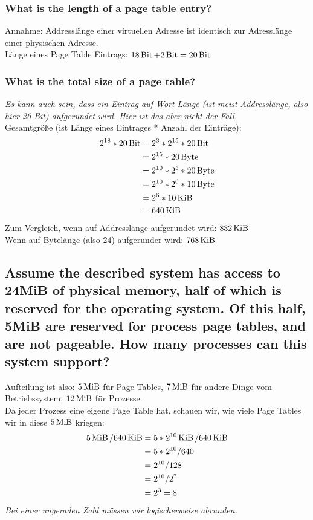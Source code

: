 \subsubsection{What is the length of a page table entry?}
Annahme: Addresslänge einer virtuellen Adresse ist identisch zur Adresslänge einer physischen Adresse.\\
Länge eines Page Table Eintrags: $18\operatorname{Bit} + 2\operatorname{Bit} = 20\operatorname{Bit}$

\subsubsection{What is the total size of a page table?}
\textit{Es kann auch sein, dass ein Eintrag auf Wort Länge (ist meist Addresslänge, also hier 26 Bit) aufgerundet wird. Hier ist das aber nicht der Fall.}\\
Gesamtgröße (ist Länge eines Eintrages * Anzahl der Einträge):
$$
\begin{aligned}
    2^{18} * 20\operatorname{Bit} &= 2^3 * 2^{15} * 20 \operatorname{Bit}\\
    &= 2^{15} * 20 \operatorname{Byte}\\
    &= 2^{10} * 2^5 * 20 \operatorname{Byte}\\
    &= 2^{10} * 2^6 * 10 \operatorname{Byte}\\
    &= 2^6 * 10 \operatorname{KiB}\\
    &= 640 \operatorname{KiB}
\end{aligned}
$$
Zum Vergleich, wenn auf Addresslänge aufgerundet wird: $832 \operatorname{KiB}$\\
Wenn auf Bytelänge (also 24) aufgerunder wird: $768 \operatorname{KiB}$

\subsection{Assume the described system has access to 24MiB of physical memory, half of which is reserved for the operating system. Of this half, 5MiB are reserved for process page tables, and are not pageable. How many processes can this system support?}
Aufteilung ist also: $5 \operatorname{MiB}$ für Page Tables, $7 \operatorname{MiB}$ für andere Dinge vom Betriebssystem, $12 \operatorname{MiB}$ für Prozesse.\\
Da jeder Prozess eine eigene Page Table hat, schauen wir, wie viele Page Tables wir in diese $5 \operatorname{MiB}$ kriegen:
$$
\begin{aligned}
    5 \operatorname{MiB} / 640 \operatorname{KiB} &= 5 * 2^{10} \operatorname{KiB} / 640 \operatorname{KiB}\\
    &= 5 * 2^{10} / 640\\
    &= 2^{10} / 128\\
    &= 2^{10} / 2^7\\
    &= 2^3 = 8
\end{aligned}
$$
\textit{Bei einer ungeraden Zahl müssen wir logischerweise abrunden.}

